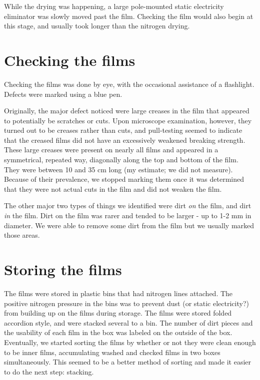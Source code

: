 \documentclass{article}
\begin{document}
While the drying was happening, a large pole-mounted static electricity eliminator was slowly moved past the film.  Checking the film would also begin at this stage, and usually took longer than the nitrogen drying. 

\section{Checking the films}
Checking the films was done by eye, with the occasional assistance of a flashlight. %
Defects were marked using a blue pen.

 Originally, the major defect noticed were large creases in the film that appeared to potentially be scratches or cuts. Upon microscope examination, however, they turned out to be creases rather than cuts, and pull-testing seemed to indicate that the creased films did not have an excessively weakened breaking strength. 
These large creases were present on nearly all films and appeared in a symmetrical, repeated way, diagonally along the top and bottom of the film. They were between 10 and 35 cm long (my estimate; we did not measure).  Because of their prevalence, we stopped marking them once it was determined that they were not actual cuts in the film and did not weaken the film.

The other major two types of things we identified were dirt \emph{on} the film, and dirt \emph{in} the film.  Dirt on the film was rarer and tended to be larger - up to 1-2 mm in diameter.  We were able to remove some dirt from the film but we usually marked those areas. 



\section{Storing the films}
The films were stored in plastic bins that had nitrogen lines attached. The positive nitrogen pressure in the bins was to prevent dust  (or static electricity?) from building up on the films during storage. %
The films were stored folded accordion style, and were stacked several to a bin. The number of dirt pieces and the usability of each film in the box was labeled on the outside of the box. Eventually, we started sorting the films by whether or not they were clean enough to be inner films, accumulating washed and checked films in two boxes simultaneously.  This seemed to be a better method of sorting and made it easier to do the next step: stacking. 
\end{document}
